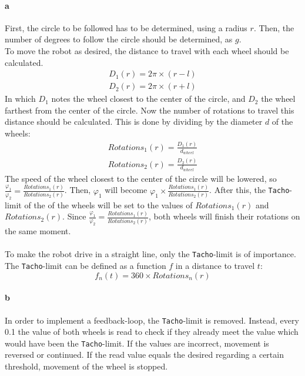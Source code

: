 \documentclass[12pt]{article}
\begin{document}
\paragraph{a} First, the circle to be followed has to be determined, using a radius $r$. Then, the number of degrees to follow the circle should be determined, as $g$. \\ 
To move the robot as desired, the distance to travel with each wheel should be calculated. 
\begin{equation}
\begin{split}
    D_1(r) = 2\pi \times (r - l) \\
    D_2(r) = 2\pi \times (r + l)
\end{split}
\end{equation}
In which $D_1$ notes the wheel closest to the center of the circle, and $D_2$ the wheel farthest from the center of the circle. Now the number of rotations to travel this distance should be calculated. This is done by dividing by the diameter $d$ of the wheels:
\begin{equation}
\begin{split}
    Rotations_1(r) = \frac{D_1(r)}{d_{wheel}} \\
    Rotations_2(r) = \frac{D_2(r)}{d_{wheel}}
\end{split}
\end{equation}
The speed of the wheel closest to the center of the circle will be lowered, so $\frac{\varphi_1}{\varphi_2} = \frac{Rotations_1(r)}{Rotations_2(r)}$. Then, $\varphi_1$ will become $\varphi_1 \times \frac{Rotations_1(r)}{Rotations_2(r)}$. After this, the \verb|Tacho|-limit of the of the wheels will be set to the values of $Rotations_1(r)$ and $Rotations_2(r)$. Since $\frac{\varphi_1}{\varphi_2} = \frac{Rotations_1(r)}{Rotations_2(r)}$, both wheels will finish their rotations on the same moment. \\ \\
To make the robot drive in a straight line, only the \verb|Tacho|-limit is of importance. The \verb|Tacho|-limit can be defined as a function $f$ in a distance to travel $t$:
\begin{equation}
    f_n(t) = 360 \times Rotations_n(r)
\end{equation}
\paragraph{b} In order to implement a feedback-loop, the \verb|Tacho|-limit is removed. Instead, every 0.1 the value of both wheels is read to check if they already meet the value which would have been the \verb|Tacho|-limit. If the values are incorrect, movement is reversed or continued. If the read value equals the desired regarding a certain threshold, movement of the wheel is stopped.
\end{document}
